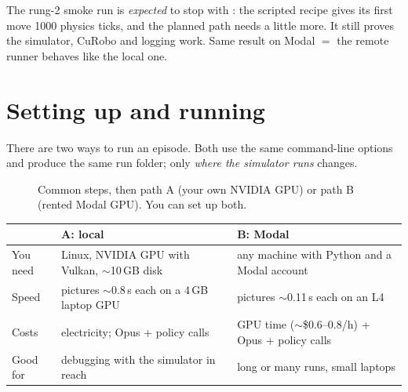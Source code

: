 \documentclass[11pt,a4paper]{article}
\newcommand{\code}[1]{\texttt{\detokenize{#1}}}
\begin{document}
\begin{keyidea}
The rung-2 smoke run is \emph{expected} to stop with \code{"outcome": "step_budget"}: the scripted
recipe gives its first move 1000 physics ticks, and the planned path needs a little more. It still
proves the simulator, CuRobo and logging work. Same result on Modal $=$ the remote runner behaves
like the local one.
\end{keyidea}

\section{Setting up and running}

There are two ways to run an episode. Both use the same command-line options and produce the same
run folder; only \emph{where the simulator runs} changes.

\begin{figure}[H]
\centering
{}
\caption{Common steps, then path A (your own NVIDIA GPU) or path B (rented Modal GPU). You can set up both.}
\end{figure}

\begin{center}
\small
\begin{tabularx}{\textwidth}{>{\raggedright\arraybackslash}p{3.2cm}>{\raggedright\arraybackslash}X>{\raggedright\arraybackslash}X}
\toprule
 & \textbf{A: local} & \textbf{B: Modal} \\
\midrule
You need & Linux, NVIDIA GPU with Vulkan, $\sim$10\,GB disk & any machine with Python and a Modal account \\
Speed & pictures $\sim$0.8\,s each on a 4\,GB laptop GPU & pictures $\sim$0.11\,s each on an L4 \\
Costs & electricity; Opus + policy calls & GPU time ($\sim$\$0.6--0.8/h) + Opus + policy calls \\
Good for & debugging with the simulator in reach & long or many runs, small laptops \\
\bottomrule
\end{tabularx}
\end{center}
\end{document}
